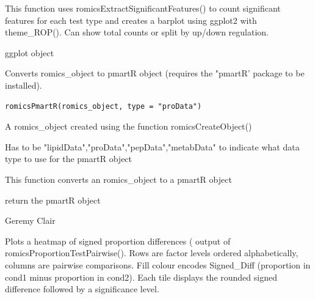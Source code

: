 \documentclass[a4paper]{book}
\begin{document}
%
\begin{Details}
This function uses romicsExtractSignificantFeatures() to count significant features for each test type
and creates a barplot using ggplot2 with theme\_ROP(). Can show total counts or split by up/down regulation.
\end{Details}
%
\begin{Value}
ggplot object
\end{Value}
%
\begin{Author}
\end{Author}
%
\begin{Description}
Converts romics\_object to pmartR object (requires the "pmartR' package to be installed).
\end{Description}
%
\begin{Usage}
\begin{verbatim}
romicsPmartR(romics_object, type = "proData")
\end{verbatim}
\end{Usage}
%
\begin{Arguments}
\begin{ldescription}
\item[\code{romics\_object}] A romics\_object created using the function romicsCreateObject()

\item[\code{type}] Has to be "lipidData","proData","pepData","metabData" to indicate what data type to use for the pmartR object
\end{ldescription}
\end{Arguments}
%
\begin{Details}
This function converts an romics\_object to a pmartR object
\end{Details}
%
\begin{Value}
return the pmartR object
\end{Value}
%
\begin{Author}
Geremy Clair
\end{Author}
%
\begin{Description}
Plots a heatmap of signed proportion differences (
output of romicsProportionTestPairwise(). Rows are factor levels
ordered alphabetically, columns are pairwise comparisons. Fill colour
encodes Signed\_Diff (proportion in cond1 minus proportion in cond2).
Each tile displays the rounded signed difference followed by a significance level.
\end{Description}
\end{document}
